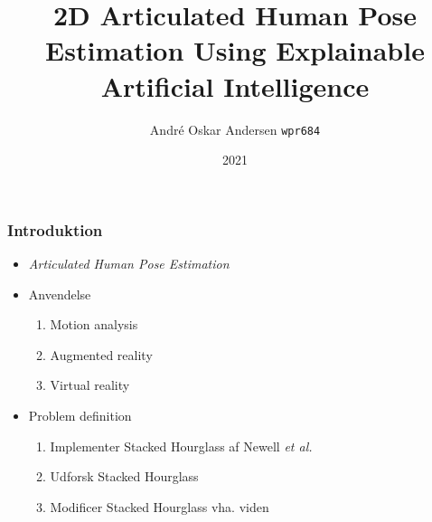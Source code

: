 \documentclass{beamer}
\begin{document}
\title{2D Articulated Human Pose Estimation
\newline \small Using Explainable Artificial Intelligence}

\author{André Oskar Andersen
\newline \small \texttt{wpr684}}


\date{2021}

\frame{\titlepage}

\begin{frame}
    \frametitle{Introduktion}
    \begin{minipage}{0.5\textwidth}
        \begin{itemize}
          \item<2-> \textit{Articulated Human Pose Estimation}
          \item<3-> Anvendelse
          \begin{enumerate}
              \item Motion analysis
              \item Augmented reality
              \item Virtual reality
          \end{enumerate}
          \item<4-> Problem definition
          \begin{enumerate}
              \item Implementer Stacked Hourglass af Newell \textit{et al.}
              \item Udforsk Stacked Hourglass
              \item Modificer Stacked Hourglass vha. viden
          \end{enumerate}
        \end{itemize}
      \end{minipage} \hfill
      \begin{minipage}{0.45\textwidth}
      \end{minipage}
\end{frame}
\end{document}
